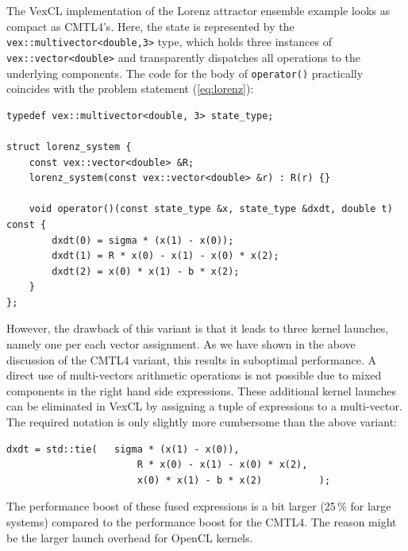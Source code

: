 \documentclass[final]{siamltex}
\newcommand{\code}[1]{\lstinline$#1$}
\newcommand{\eqref}[1]{(\ref{#1})}
\begin{document}
The VexCL implementation of the Lorenz attractor ensemble example looks as
compact as CMTL4's. Here, the state is represented by the
\code{vex::multivector<double,3>} type, which holds three instances of
\code{vex::vector<double>} and transparently dispatches all operations to the
underlying components. The code for the body of \code{operator()} practically
coincides with the problem statement \eqref{eq:lorenz}:
\begin{lstlisting}
typedef vex::multivector<double, 3> state_type;

struct lorenz_system {
    const vex::vector<double> &R;
    lorenz_system(const vex::vector<double> &r) : R(r) {}

    void operator()(const state_type &x, state_type &dxdt, double t) const {
        dxdt(0) = sigma * (x(1) - x(0));
        dxdt(1) = R * x(0) - x(1) - x(0) * x(2);
        dxdt(2) = x(0) * x(1) - b * x(2);
    }
};
\end{lstlisting}

However, the drawback of this variant is that it leads to three kernel
launches, namely one per each vector assignment. As we have shown in
the above discussion of the CMTL4 variant, this results in suboptimal
performance. A direct use of multi-vectors arithmetic operations is
not possible due to mixed components in the right hand side
expressions.  These additional kernel launches can be eliminated in
VexCL by assigning a tuple of expressions to a multi-vector. The
required notation is only slightly more cumbersome than the above
variant:
\begin{lstlisting}[firstnumber=9]
    dxdt = std::tie(   sigma * (x(1) - x(0)),
                       R * x(0) - x(1) - x(0) * x(2),
                       x(0) * x(1) - b * x(2)          );
\end{lstlisting}
The performance boost of these fused expressions is a bit larger
(25\,\% for large systems) compared to the performance boost for the
CMTL4. The reason might be the larger launch overhead for OpenCL
kernels.
\end{document}
